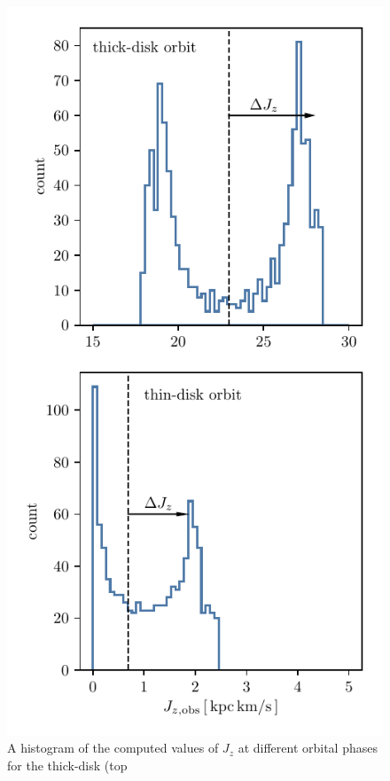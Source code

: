 \documentclass[twocolumn]{aastex62}
\begin{document}
\begin{figure}
\begin{center}
\includegraphics[width=\columnwidth]{fig/schmactions_Jz_zerr_hist.pdf}
\end{center}
\caption{A histogram of the computed values of $J_z$ at different orbital phases for the thick-disk (top
}
\end{figure}
\end{document}
